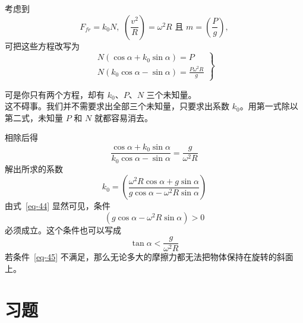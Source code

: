 \begin{dialogue}
考虑到
\begin{equation*}%
F_{fr}=k_{0}N, \, \, \left( \frac{v^{2}}{R} \right)=\omega^{2}R \, \, \text{且} \, \, m=\left(\frac{P}{g} \right),
\end{equation*}
可把这些方程改写为
\begin{equation*}%
\left.
\begin{aligned}
N (\cos \alpha + k_{0} \sin \alpha)=P \\
N(k_{0} \cos \alpha -\sin \alpha)=\frac{P \omega^{2} R}{g}
\end{aligned}
\right\}
\end{equation*}

\stdb 可是你只有两个方程，却有 $k_{0}$、$P$、$N$ 三个未知量。\\
\tchr 这不碍事。我们并不需要求出全部三个未知量，只要求出系数 $k_{0}$。用第一式除以第二式，未知量 $P$ 和 $N$ 就都容易消去。

\stda 相除后得
\begin{equation*}%
\frac{\cos \alpha+ k_{0} \sin \alpha}{k_{0} \cos \alpha - \sin \alpha} = \frac{g}{\omega^{2}R}
\end{equation*}
解出所求的系数
\begin{equation}%
k_{0} =\left( \frac{\omega^{2}R \cos \alpha+g \sin \alpha}{g \cos \alpha- \omega^{2} R \sin \alpha} \right)
\label{eq-44}
\end{equation}
\tchr 由式~\eqref{eq-44} 显然可见，条件
\begin{equation*}%
\left( g \cos \alpha- \omega^{2}R \sin \alpha \right) >0
\end{equation*}
必须成立。这个条件也可以写成
\begin{equation}%
\tan \alpha < \frac{g}{\omega^{2}R}
\label{eq-45}
\end{equation}
若条件~\eqref{eq-45} 不满足，那么无论多大的摩擦力都无法把物体保持在旋转的斜面上。

\end{dialogue}

\section*{习题}
\label{prob-08}

